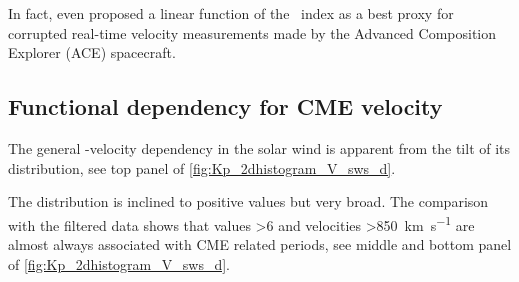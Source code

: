 In fact, \citet{Machol2013} even proposed a linear function of the \Kp~index as a best proxy for corrupted real-time velocity measurements made by the Advanced Composition Explorer (ACE) spacecraft.
 

\subsection{Functional dependency for CME velocity}
The general \Kp-velocity dependency in the solar wind is apparent from the tilt of its distribution, see top panel of \autoref{fig:Kp_2dhistogram_V_sws_d}.
\begin{figure}
\end{figure}
The distribution is inclined to positive values but very broad. The comparison with the filtered data shows that \Kp{} values \num{>6} and velocities \SI{>850}{\km\per\s} are almost always associated with CME related periods, see middle and bottom panel of \autoref{fig:Kp_2dhistogram_V_sws_d}.

